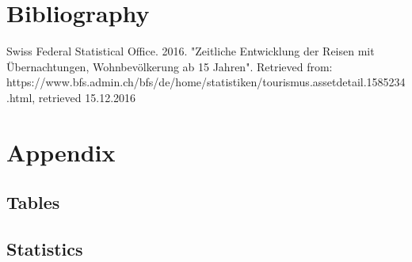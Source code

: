 \documentclass[12pt,a4paper,bibliography=totocnumbered,listof=totocnumbered]{scrartcl}
\begin{document}



%


%










\section{Bibliography}

Swiss Federal Statistical Office. 2016. "Zeitliche Entwicklung der Reisen mit Übernachtungen, Wohnbevölkerung ab 15 Jahren". Retrieved from: \\https://www.bfs.admin.ch/bfs/de/home/statistiken/tourismus.assetdetail.1585234.html, retrieved 15.12.2016



\section{Appendix}



\subsection{Tables}

\subsection{Statistics}
\end{document}
